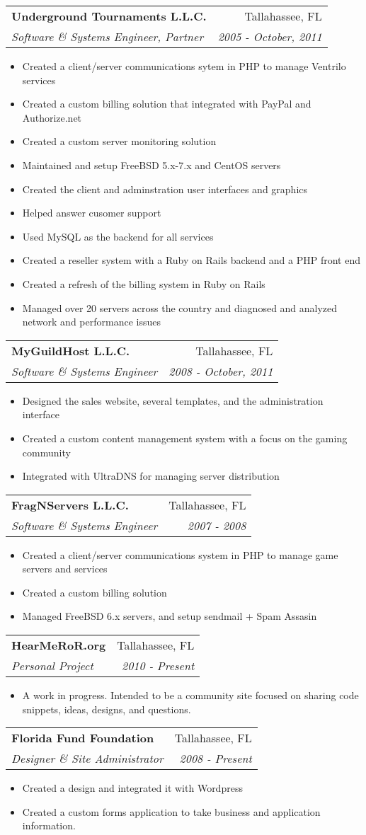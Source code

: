 \documentclass[letterpaper,11pt]{article}
\makeatletter
\newcommand{\resitem}[1]{\item #1 \vspace{-2pt}}
\newcommand{\ressubheading}[4]{
\begin{tabular*}{7.0in}{l@{\extracolsep{\fill}}r}
		\textbf{#1} & #2 \\
		\textit{#3} & \textit{#4} \\
\end{tabular*}\vspace{-6pt}}
\makeatother
\begin{document}
\ressubheading{Underground Tournaments L.L.C.}{Tallahassee, FL}{Software \& Systems Engineer, Partner}{2005 - October, 2011}
\begin{itemize} 
        \resitem{Created a client/server communications sytem in PHP to manage Ventrilo services} 
        \resitem{Created a custom billing solution that integrated with PayPal and Authorize.net}
        \resitem{Created a custom server monitoring solution}
        \resitem{Maintained and setup FreeBSD 5.x-7.x and CentOS servers}
        \resitem{Created the client and adminstration user interfaces and graphics}
        \resitem{Helped answer cusomer support}
        \resitem{Used MySQL as the backend for all services}
        \resitem{Created a reseller system with a Ruby on Rails backend and a PHP front end}
        \resitem{Created a refresh of the billing system in Ruby on Rails}
        \resitem{Managed over 20 servers across the country and diagnosed and analyzed network and performance issues}
\end{itemize}

\ressubheading{MyGuildHost L.L.C.}{Tallahassee, FL}{Software \& Systems Engineer}{2008 - October, 2011}
\begin{itemize} 
        \resitem{Designed the sales website, several templates, and the administration interface}
        \resitem{Created a custom content management system with a focus on the gaming community}
        \resitem{Integrated with UltraDNS for managing server distribution}
\end{itemize}


\pagebreakwithheader

\ressubheading{FragNServers L.L.C.}{Tallahassee, FL}{Software \& Systems Engineer}{2007 - 2008}
\begin{itemize} 
        \resitem{Created a client/server communications system in PHP to manage game servers and services}
        \resitem{Created a custom billing solution}
        \resitem{Managed FreeBSD 6.x servers, and setup sendmail + Spam Assasin}
\end{itemize}

\ressubheading{HearMeRoR.org}{Tallahassee, FL}{Personal Project}{2010 - Present}
\begin{itemize} 
        \resitem{A work in progress. Intended to be a community site focused on sharing code snippets, ideas, designs, and questions.}
\end{itemize}

\ressubheading{Florida Fund Foundation}{Tallahassee, FL}{Designer \& Site Administrator}{2008 - Present}
\begin{itemize} 
        \resitem{Created a design and integrated it with Wordpress}
        \resitem{Created a custom forms application to take business and application information.}
\end{itemize}
\end{document}
